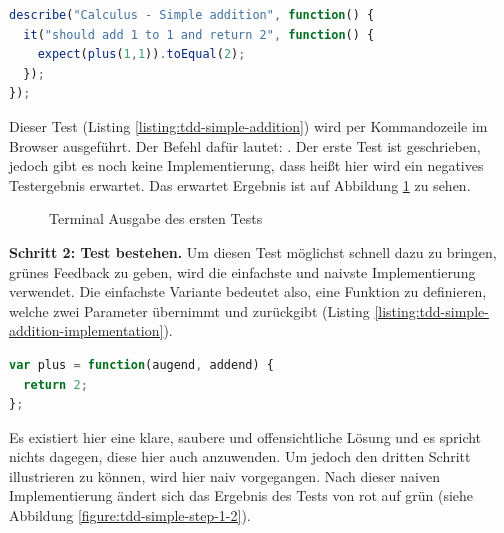 \begin{lstlisting}[language=JavaScript, caption=TDD - Calculus - Simple addition, label=listing:tdd-simple-addition]
describe("Calculus - Simple addition", function() {
  it("should add 1 to 1 and return 2", function() {
    expect(plus(1,1)).toEqual(2);
  });
});
\end{lstlisting}

Dieser Test (Listing \ref{listing:tdd-simple-addition}) wird per Kommandozeile im Browser  ausgeführt. Der Befehl dafür lautet: . Der erste Test ist geschrieben, jedoch gibt es noch keine Implementierung, dass heißt hier wird ein negatives Testergebnis erwartet. Das erwartet Ergebnis ist auf Abbildung \ref{figure:tdd-simple-step-1-1} zu sehen.

\begin{figure}[H]
  \centering
  \caption{Terminal Ausgabe des ersten Tests}
  \label{figure:tdd-simple-step-1-1}
\end{figure}

\textbf{Schritt 2: Test bestehen.}\newline
Um diesen Test möglichst schnell dazu zu bringen, grünes Feedback zu geben, wird die einfachste und naivste Implementierung verwendet. Die einfachste Variante bedeutet also, eine Funktion zu definieren, welche zwei Parameter übernimmt und \glqq{2\grqq} zurückgibt (Listing \ref{listing:tdd-simple-addition-implementation}).

\begin{lstlisting}[language=JavaScript, caption=TDD - Calculus - Simple addition - Implementation, label=listing:tdd-simple-addition-implementation]
var plus = function(augend, addend) {
  return 2;
};
\end{lstlisting}

Es existiert hier eine klare, saubere und offensichtliche Lösung und es spricht nichts dagegen, diese hier auch anzuwenden. Um jedoch den dritten Schritt illustrieren zu können, wird hier naiv vorgegangen.\newline
Nach dieser naiven Implementierung ändert sich das Ergebnis des Tests von rot auf grün (siehe Abbildung \ref{figure:tdd-simple-step-1-2}).

